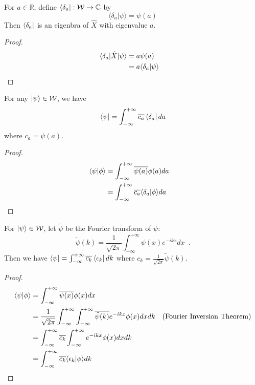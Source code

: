 \begin{prop}
For $a \in \mathbb{R}$, define $\bra{\delta_a} : \mathcal{W} \rightarrow \mathbb{C}$ by
\[ \langle \delta_a | \psi \rangle = \psi(a) \]
Then $\bra{\delta_a}$ is an eigenbra of $\hat{X}$ with eigenvalue $a$.
\end{prop}

\begin{proof}
\pf
\begin{align*}
\langle \delta_a | \hat{X} | \psi \rangle & = a \psi(a) \\
& = a \langle \delta_a | \psi \rangle & \qed
\end{align*}
\end{proof}

\begin{prop}
For any $\ket{\psi} \in \mathcal{W}$, we have
\[ \bra{\psi} = \int_{-\infty}^{+\infty} \overline{c_a} \bra{\delta_a} da \]
where $c_a = \psi(a)$.
\end{prop}

\begin{proof}
\pf
\begin{align*}
\langle \psi | \phi \rangle & = \int_{-\infty}^{+ \infty} \overline{\psi(a)} \phi(a) da \\
& = \int_{-\infty}^{+ \infty} \overline{c_a} \langle \delta_a | \phi \rangle da & \qed
\end{align*}
\end{proof}

\begin{prop}
For $\ket{\psi} \in \mathcal{W}$, let $\tilde{\psi}$ be the Fourier transform of $\psi$:
\[ \tilde{\psi}(k) = \frac{1}{\sqrt{2 \pi}} \int_{-\infty}^{+ \infty} \psi(x) e^{-ikx} dx \enspace . \]
Then we have $\bra{\psi} = \int_{-\infty}^{+ \infty} \overline{c_k} \bra{\epsilon_k} dk$ where $c_k = \frac{1}{\sqrt{2 \pi}} \tilde{\psi}(k)$.
\end{prop}

\begin{proof}
\pf
\begin{align*}
\langle \psi | \phi \rangle
& = \int_{-\infty}^{+ \infty} \overline{\psi(x)} \phi(x) dx \\
& = \frac{1}{\sqrt{2 \pi}} \int_{-\infty}^{+ \infty} \int_{- \infty}^{+ \infty} \overline{\tilde{\psi}(k)} e^{-ikx} \phi(x) dx dk & (\text{Fourier Inversion Theorem}) \\
& = \int_{-\infty}^{+ \infty} \overline{c_k} \int_{-\infty}^{+ \infty} e^{-ikx} \phi(x) dx dk \\
& = \int_{-\infty}^{+\infty} \overline{c_k} \langle  \epsilon_k | \phi \rangle dk & \qed
\end{align*}
\end{proof}

